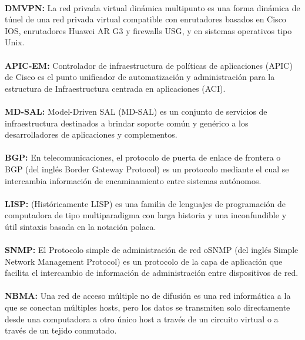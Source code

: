 	\\
	\textbf{DMVPN:} La red privada virtual dinámica multipunto es una forma dinámica de túnel de una red privada virtual compatible con enrutadores basados en Cisco IOS, enrutadores Huawei AR G3 y firewalls USG, y en sistemas operativos tipo Unix.
	\\
	\\
	\textbf{APIC-EM:} Controlador de infraestructura de políticas de aplicaciones (APIC) de Cisco es el punto unificador de automatización y administración para la estructura de Infraestructura centrada en aplicaciones (ACI).
	\\
	\\
	\textbf{MD-SAL:} Model-Driven SAL (MD-SAL) es un conjunto de servicios de infraestructura destinados a brindar soporte común y genérico a los desarrolladores de aplicaciones y complementos.
	\\
	\\	
	\textbf{BGP:} En telecomunicaciones, el protocolo de puerta de enlace de frontera o BGP (del inglés Border Gateway Protocol) es un protocolo mediante el cual se intercambia información de encaminamiento entre sistemas autónomos.
	\\
	\\
	\textbf{LISP:} (Históricamente LISP) es una familia de lenguajes de programación de computadora de tipo multiparadigma con larga historia y una inconfundible y útil sintaxis basada en la notación polaca.
	\\
	\\	
	\textbf{SNMP:}
	El Protocolo simple de administración de red oSNMP (del inglés Simple Network Management Protocol) es un protocolo de la capa de aplicación que facilita el intercambio de información de administración entre dispositivos de red.
	\\
	\\	
	\textbf{NBMA:}
	Una red de acceso múltiple no de difusión es una red informática a la que se conectan múltiples hosts, pero los datos se transmiten solo directamente desde una computadora a otro único host a través de un circuito virtual o a través de un tejido conmutado.
